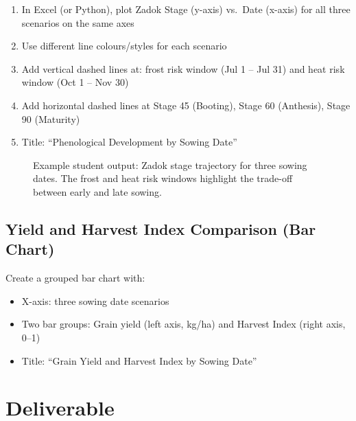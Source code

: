\begin{enumerate}
  \item In Excel (or Python), plot Zadok Stage (y-axis) vs.~Date (x-axis) for all three scenarios on the same axes
  \item Use different line colours/styles for each scenario
  \item Add vertical dashed lines at: frost risk window (Jul 1 -- Jul 31) and heat risk window (Oct 1 -- Nov 30)
  \item Add horizontal dashed lines at Stage 45 (Booting), Stage 60 (Anthesis), Stage 90 (Maturity)
  \item Title: ``Phenological Development by Sowing Date''
\end{enumerate}

\begin{figure}[H]
  \centering
  \caption{Example student output: Zadok stage trajectory for three sowing dates. The frost and heat risk windows highlight the trade-off between early and late sowing.}
  \label{fig:exercise-c-phenology-plot}
\end{figure}

\subsection{Yield and Harvest Index Comparison (Bar Chart)}

Create a grouped bar chart with:
\begin{itemize}
  \item X-axis: three sowing date scenarios
  \item Two bar groups: Grain yield (left axis, kg/ha) and Harvest Index (right axis, 0--1)
  \item Title: ``Grain Yield and Harvest Index by Sowing Date''
\end{itemize}

\section{Deliverable}

